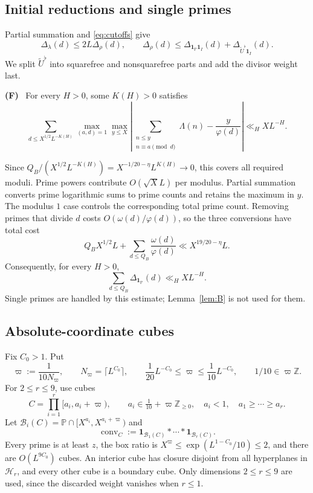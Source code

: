 \documentclass{amsart}
\newcounter{fact}
\renewcommand{\thefact}{F\arabic{fact}}
\newenvironment{fact}{\refstepcounter{fact}\par\medskip
\noindent\textbf{(\thefact)}\ }{\par\medskip}
\numberwithin{equation}{section}
\numberwithin{table}{section}
\newcommand{\Z}{\mathbb Z}
\newcommand{\PP}{\mathbb P}
\newcommand{\ind}{\mathbf 1}
\newcommand{\conv}{\operatorname{conv}}
\begin{document}
\subsection{Initial reductions and single primes}

Partial summation and \eqref{eq:cutoffs} give
\begin{equation}\label{eq:BV-reductions}
\Delta_\lambda(d)\le2L\Delta_\rho(d),\qquad
\Delta_\rho(d)\le
\Delta_{\ind_\PP\ind_I}(d)+\Delta_{\widetilde U^\flat\ind_I}(d).
\end{equation}
We split $\widetilde U^\flat$ into squarefree and nonsquarefree parts
and add the divisor weight last.

\begin{fact}\label{fact:classical-BV}
\cite[Chapter~28]{Da} For every $H>0$, some $K(H)>0$ satisfies
\begin{equation}
\sum_{d\le X^{1/2}L^{-K(H)}}
\max_{(a,d)=1}\max_{y\le X}
\left|\sum_{\substack{n\le y\\n\equiv a\pmod d}}\Lambda(n)
-\frac{y}{\varphi(d)}\right|
\ll_H XL^{-H}.
\end{equation}
\end{fact}

Since $Q_B/(X^{1/2}L^{-K(H)})=X^{-1/20-\eta}L^{K(H)}\to0$,
this covers all required moduli. Prime powers contribute
$O(\sqrt X L)$ per modulus. Partial summation converts prime logarithmic
sums to prime counts and retains the maximum in $y$. The modulus
$1$ case controls the corresponding total prime count.
Removing primes that divide $d$ costs $O(\omega(d)/\varphi(d))$, so the
three conversions have total cost
\[
Q_BX^{1/2}L+\sum_{d\le Q_B}\frac{\omega(d)}{\varphi(d)}
\ll X^{19/20-\eta}L.
\]
Consequently, for every $H>0$,
\begin{equation}\label{eq:prime-BV}
\sum_{d\le Q_B}\Delta_{\ind_\PP}(d)\ll_H XL^{-H}.
\end{equation}
Single primes are handled by this estimate; Lemma~\ref{lem:B} is not
used for them.

\subsection{Absolute-coordinate cubes}

Fix $C_0>1$. Put
\[
\varpi:=\frac1{10N_\varpi},\qquad
N_\varpi=\lceil L^{C_0}\rceil,\qquad
\frac1{20}L^{-C_0}\le\varpi\le\frac1{10}L^{-C_0},
\qquad 1/10\in\varpi\mathbb Z.
\]
For $2\le r\le9$, use cubes
\begin{equation}\label{eq:cubes}
C=\prod_{i=1}^r[a_i,a_i+\varpi),\qquad
a_i\in\tfrac1{10}+\varpi\Z_{\ge0},\quad
a_i<1,\quad a_1\ge\cdots\ge a_r.
\end{equation}
Let $\mathcal B_i(C)=\PP\cap[X^{a_i},X^{a_i+\varpi})$ and
\[
\conv_C:=\ind_{\mathcal B_1(C)}*\cdots*\ind_{\mathcal B_r(C)}.
\]
Every prime is at least $z$, the box ratio is
$X^\varpi\le\exp(L^{1-C_0}/10)\le2$, and there are $O(L^{9C_0})$ cubes.
An interior cube has closure disjoint from all hyperplanes in
$\mathcal H_r$, and every other cube is a boundary cube.
Only dimensions $2\le r\le9$ are used, since the discarded weight vanishes
when $r\le1$.
\end{document}
